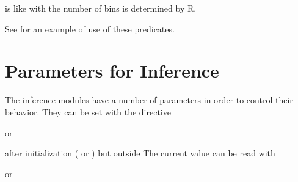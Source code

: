 \documentclass[letterpaper,10pt,english]{sphinxmanual}
\begin{document}
\sphinxAtStartPar
is like  with the number of bins is determined by R.

\sphinxAtStartPar
See  for an example of use of these predicates.


\section{Parameters for Inference}
\label{\detokenize{index:parameters-for-inference}}
\sphinxAtStartPar
The inference modules have a number of parameters in order to control their behavior.
They can be set with the directive

\begin{sphinxVerbatim}[commandchars=\\\{\}]
 
\end{sphinxVerbatim}

\sphinxAtStartPar
or

\begin{sphinxVerbatim}[commandchars=\\\{\}]
 
\end{sphinxVerbatim}

\sphinxAtStartPar
after initialization ( or ) but outside 
The current value can be read with

\begin{sphinxVerbatim}[commandchars=\\\{\}]
 
\end{sphinxVerbatim}

\sphinxAtStartPar
or

\begin{sphinxVerbatim}[commandchars=\\\{\}]
 
\end{sphinxVerbatim}
\end{document}
